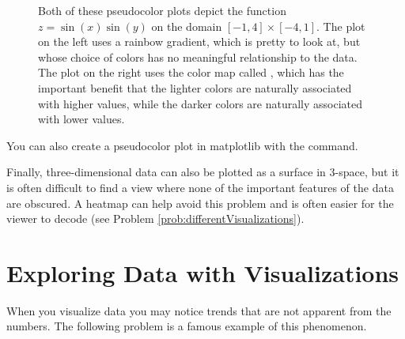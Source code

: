 \begin{figure}
\begin{subfigure}{.5\textwidth}
\end{subfigure}
\caption{Both of these pseudocolor plots depict the function $z = \sin(x)\sin(y)$ on the domain $[-1,4] \times [-4,1]$. 
The plot on the left uses a rainbow gradient, which is pretty to look at, but whose choice of colors has no meaningful relationship to the data. 
The plot on the right uses the color map called , which has the important benefit that the lighter colors are naturally associated with higher values, while the darker colors are naturally associated with lower values.}
\label{fig:heatmap}
\end{figure}



You can also create a pseudocolor plot in matplotlib with the  command.

Finally, three-dimensional data can also be plotted as a surface in 3-space, but it is often difficult to find a view where none of the important features of the data are obscured.
A heatmap can help avoid this problem and is often easier for the viewer to decode (see Problem \ref{prob:differentVisualizations}).

\section*{Exploring Data with Visualizations}
When you visualize data you may notice trends that are not apparent from the numbers. 
The following problem is a famous example of this phenomenon.

